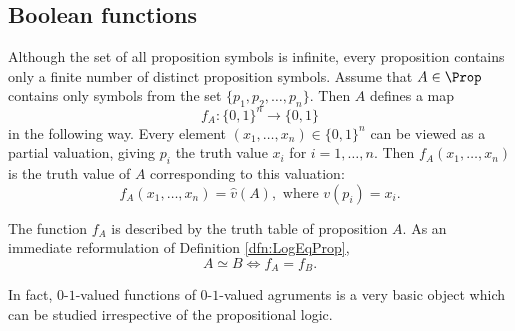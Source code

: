 

\setcounter{section}{1}
\setcounter{subsection}{4}
\setcounter{dfn}{10}

\subsection{Boolean functions}
Although the set of all proposition symbols is infinite,
every proposition contains only a finite number of distinct proposition symbols.
Assume that $A \in \Prop$ contains only symbols from the set $\{p_1, p_2, \ldots, p_n\}$.
Then $A$ defines a map
\[
f_A \colon \{0,1\}^n \to \{0,1\}
\]
in the following way.
Every element $(x_1, \ldots, x_n) \in \{0,1\}^n$ can be viewed as a partial valuation, giving $p_i$ the truth value $x_i$ for $i = 1, \ldots, n$.
Then $f_A(x_1, \ldots, x_n)$ is the truth value of $A$ corresponding to this valuation:
\[
f_A(x_1, \ldots, x_n) = \hat{v}(A), \text{ where } v(p_i) = x_i.
\]

The function $f_A$ is described by the truth table of proposition $A$.
As an immediate reformulation of Definition \ref{dfn:LogEqProp},
\[
A \simeq B \Leftrightarrow f_A = f_B.
\]

In fact, $0$-$1$-valued functions of $0$-$1$-valued agruments is a very basic object which can be studied irrespective of the propositional logic.

